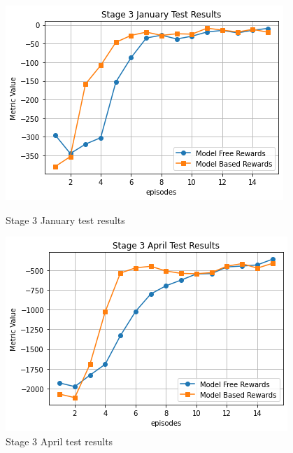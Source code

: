\documentclass{article}
\begin{document}
\begin{figure}[H]
  \centering
  \begin{minipage}[t]{0.48\textwidth}
    \centering
    \includegraphics[width=\textwidth]{ExperimentResults/Stage_3_Jan_Test_Results.png}
    \caption{Stage 3 January test results}
    \label{fig:stage3-jan}
  \end{minipage}
  \hfill
  \begin{minipage}[t]{0.48\textwidth}
    \centering
    \includegraphics[width=\textwidth]{ExperimentResults/Stage_3_April_Test_Results.png}
    \caption{Stage 3 April test results}
    \label{fig:stage3-april}
  \end{minipage}

  \vspace{1em}  %


\end{figure}
\end{document}
